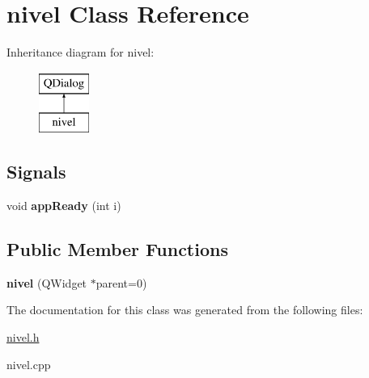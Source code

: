 \hypertarget{classnivel}{\section{nivel Class Reference}
\label{classnivel}
}
Inheritance diagram for nivel\-:\begin{figure}[H]
\begin{center}
\leavevmode
\includegraphics[height=2.000000cm]{classnivel}
\end{center}
\end{figure}
\subsection*{Signals}
\begin{DoxyCompactItemize}
\item 
\hypertarget{classnivel_a8a46a97c07c0cc03939e26108e9ffb80}{void {\bfseries app\-Ready} (int i)}\label{classnivel_a8a46a97c07c0cc03939e26108e9ffb80}

\end{DoxyCompactItemize}
\subsection*{Public Member Functions}
\begin{DoxyCompactItemize}
\item 
\hypertarget{classnivel_add84530f153521109b3c306edf61db1d}{{\bfseries nivel} (Q\-Widget $\ast$parent=0)}\label{classnivel_add84530f153521109b3c306edf61db1d}

\end{DoxyCompactItemize}


The documentation for this class was generated from the following files\-:\begin{DoxyCompactItemize}
\item 
\hyperlink{nivel_8h}{nivel.\-h}\item 
nivel.\-cpp\end{DoxyCompactItemize}
